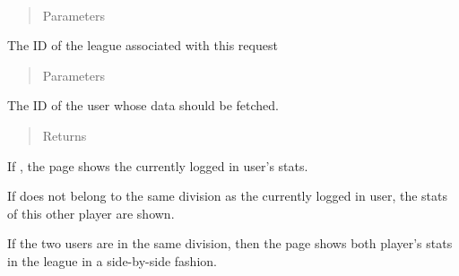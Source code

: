 \documentclass[letterpaper,10pt,english]{sphinxmanual}
\begin{document}
\begin{fulllineitems}
\label{\detokenize{tiger_leagues/readme:tiger_leagues.league.league_member}}~\begin{quote}\begin{description}
\item[{Parameters}] \leavevmode
{} \textendash{} 

\end{description}\end{quote}

The ID of the league associated with this request
\begin{quote}\begin{description}
\item[{Parameters}] \leavevmode
{} \textendash{} 

\end{description}\end{quote}

The ID of the user whose data should be fetched.
\begin{quote}\begin{description}
\item[{Returns}] \leavevmode
{}

\end{description}\end{quote}

If , the page shows the currently 
logged in user’s stats.

If  does not belong to the same division as the currently 
logged in user, the stats of this other player are shown.

If the two users are in the same division, then the page shows both player’s 
stats in the league in a side-by-side fashion.

\end{fulllineitems}

\end{document}
